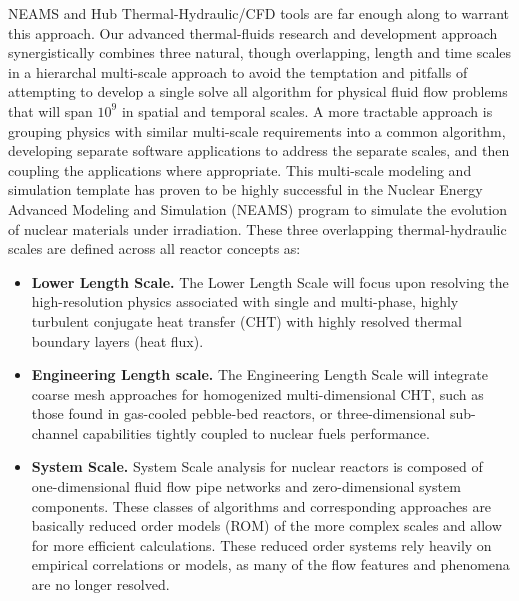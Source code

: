 NEAMS and Hub Thermal-Hydraulic/CFD tools are far enough along to warrant this approach.
Our advanced thermal-fluids research and development approach synergistically combines three natural,
though overlapping, length and time scales in a hierarchal multi-scale approach to avoid the temptation and
pitfalls of attempting to develop a single solve all algorithm for physical fluid flow problems that will span $10^{9}$ in spatial and temporal scales. A more tractable approach is grouping physics with similar multi-scale requirements into a common algorithm, developing separate software applications to address the separate scales, and then coupling the applications where appropriate. This multi-scale modeling and simulation template has proven to be highly successful in the Nuclear Energy Advanced Modeling and Simulation (NEAMS) program to simulate the evolution of nuclear materials under irradiation. These three overlapping thermal-hydraulic scales are defined across all reactor concepts as:
\begin{itemize}
    \item \textbf{Lower Length Scale.} The Lower Length Scale will focus upon resolving the high-resolution physics
    associated with single and multi-phase, highly turbulent conjugate heat transfer (CHT) with highly
    resolved thermal boundary layers (heat flux).
    \item \textbf{Engineering Length scale.} The Engineering Length Scale will integrate coarse mesh approaches
    for homogenized multi-dimensional CHT, such as those found in gas-cooled pebble-bed reactors, or three-dimensional sub-channel capabilities tightly coupled to nuclear fuels performance.
    \item \textbf{System Scale.} System Scale analysis for nuclear reactors is composed of one-dimensional fluid flow
    pipe networks and zero-dimensional system components. These classes of algorithms and corresponding approaches are basically reduced order models (ROM) of the more complex scales and allow for more efficient calculations. These reduced order systems rely heavily on empirical correlations or models, as many of the flow features and phenomena are no longer resolved.
\end{itemize}

